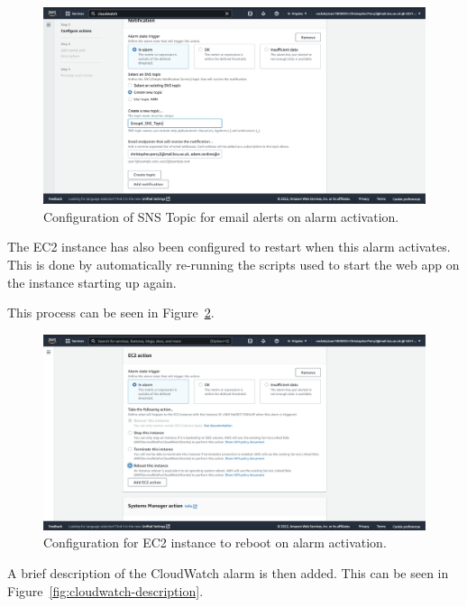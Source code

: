 \begin{figure}[!htbp]
    \centering
    \includegraphics[width=\textwidth]{resources/cloudwatch/cloudwatch-sns-topic}
    \caption{Configuration of SNS Topic for email alerts on alarm activation.}
    \label{fig:cloudwatch-sns-topic}
\end{figure}

The EC2 instance has also been configured to restart when this alarm activates.
This is done by automatically re-running the scripts used to start the web app on the instance starting up again.

This process can be seen in Figure~\ref{fig:cloudwatch-ec2-actions}.

\begin{figure}[!htbp]
    \centering
    \includegraphics[width=\textwidth]{resources/cloudwatch/cloudwatch-ec2-actions}
    \caption{Configuration for EC2 instance to reboot on alarm activation.}
    \label{fig:cloudwatch-ec2-actions}
\end{figure}

A brief description of the CloudWatch alarm is then added.
This can be seen in Figure~\ref{fig:cloudwatch-description}.

